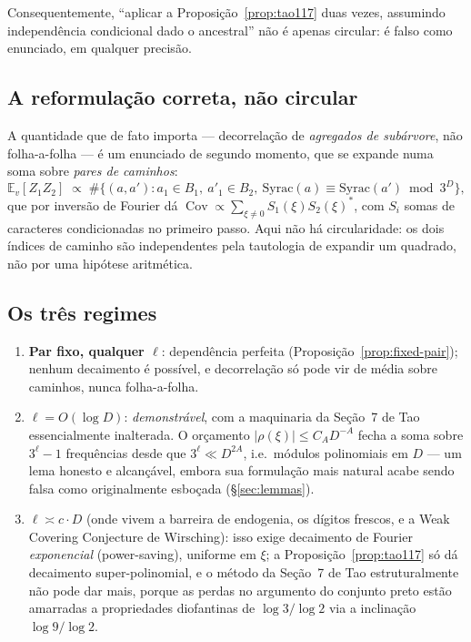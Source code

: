 \documentclass[11pt]{article}
\theoremstyle{definition}
\theoremstyle{remark}
\DeclareMathOperator{\Cov}{Cov}
\begin{document}
Consequentemente, ``aplicar a Proposição~\ref{prop:tao117} duas vezes,
assumindo independência condicional dado o ancestral'' não é apenas
circular: é falso como enunciado, em qualquer precisão.

\subsection{A reformulação correta, não circular}

A quantidade que de fato importa --- decorrelação de \emph{agregados
de subárvore}, não folha-a-folha --- é um enunciado de segundo
momento, que se expande numa soma sobre \emph{pares de caminhos}:
\[
  \mathbb{E}_v[Z_1 Z_2] \;\propto\; \#\{(a,a') : a_1\in B_1,\ a'_1\in
  B_2,\ \mathrm{Syrac}(a)\equiv\mathrm{Syrac}(a') \bmod 3^D\},
\]
que por inversão de Fourier dá $\Cov \propto \sum_{\xi\ne 0}
S_1(\xi)S_2(\xi)^\ast$, com $S_i$ somas de caracteres condicionadas no
primeiro passo. Aqui não há circularidade: os dois índices de caminho
são independentes pela tautologia de expandir um quadrado, não por
uma hipótese aritmética.

\subsection{Os três regimes}

\begin{enumerate}
\item \textbf{Par fixo, qualquer $\ell$}: dependência perfeita
  (Proposição~\ref{prop:fixed-pair}); nenhum decaimento é possível, e
  decorrelação só pode vir de média sobre caminhos, nunca
  folha-a-folha.
\item \textbf{$\ell = O(\log D)$}: \emph{demonstrável}, com a
  maquinaria da Seção~7 de Tao essencialmente inalterada. O orçamento
  $|\rho(\xi)|\le C_A D^{-A}$ fecha a soma sobre $3^\ell-1$ frequências
  desde que $3^\ell \ll D^{2A}$, i.e.\ módulos polinomiais em $D$ ---
  um lema honesto e alcançável, embora sua formulação mais natural
  acabe sendo falsa como originalmente esboçada (\S\ref{sec:lemmas}).
\item \textbf{$\ell \asymp c\cdot D$} (onde vivem a barreira de
  endogenia, os dígitos frescos, e a Weak Covering Conjecture de
  Wirsching): isso exige decaimento de Fourier \emph{exponencial}
  (power-saving), uniforme em $\xi$; a Proposição~\ref{prop:tao117}
  só dá decaimento super-polinomial, e o método da Seção~7 de Tao
  estruturalmente não pode dar mais, porque as perdas no argumento do
  conjunto preto estão amarradas a propriedades diofantinas de
  $\log 3/\log 2$ via a inclinação $\log 9/\log 2$.
\end{enumerate}
\end{document}

